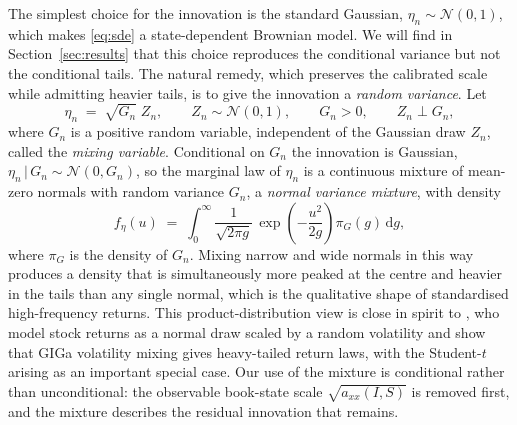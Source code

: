 \documentclass[11pt]{article}
\theoremstyle{plain}
\theoremstyle{definition}
\newcommand{\given}{\,\vert\,}
\newcommand{\dd}{\mathrm{d}}
\newcommand{\Norm}{\mathcal{N}}
\newcommand{\axx}{a_{xx}}
\begin{document}
The simplest choice for the innovation is the standard Gaussian, $\eta_n\sim
\Norm(0,1)$, which makes \eqref{eq:sde} a state-dependent Brownian model. We will
find in Section~\ref{sec:results} that this choice reproduces the conditional
variance but not the conditional tails. The natural remedy, which preserves the
calibrated scale while admitting heavier tails, is to give the innovation a
\emph{random variance}. Let
\begin{equation}
  \eta_n \;=\; \sqrt{G_n}\;Z_n,
  \qquad Z_n\sim\Norm(0,1),
  \qquad G_n>0,
  \qquad Z_n \perp G_n,
  \label{eq:mixture}
\end{equation}
where $G_n$ is a positive random variable, independent of the Gaussian draw $Z_n$,
called the \emph{mixing variable}. Conditional on $G_n$ the innovation is Gaussian,
$\eta_n\given G_n \sim \Norm(0,G_n)$, so the marginal law of $\eta_n$ is a continuous
mixture of mean-zero normals with random variance $G_n$, a \emph{normal variance
mixture}, with density
\begin{equation}
  f_\eta(u) \;=\; \int_0^\infty \frac{1}{\sqrt{2\pi g}}\,
  \exp\!\left(-\frac{u^2}{2g}\right) \pi_G(g)\,\dd g,
  \label{eq:mixture-density}
\end{equation}
where $\pi_G$ is the density of $G_n$. Mixing narrow and wide normals in this way
produces a density that is simultaneously more peaked at the centre and heavier in
the tails than any single normal, which is the qualitative shape of standardised
high-frequency returns.
This product-distribution view is close in spirit to \citet{ma2014model}, who model
stock returns as a normal draw scaled by a random volatility and show that
GIGa volatility mixing gives heavy-tailed return laws, with the Student-$t$ arising
as an important special case. Our use of the mixture is conditional rather than
unconditional: the observable book-state scale $\sqrt{\axx(I,S)}$ is removed first,
and the mixture describes the residual innovation that remains.
\end{document}

